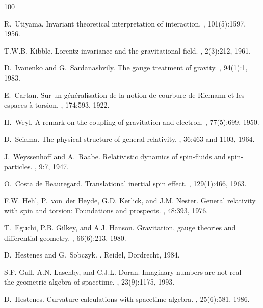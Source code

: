 \documentclass[a4paper]{article}
\numberwithin{equation}{section}
\begin{document}
\begin{thebibliography}{100}

R.~Utiyama.
\newblock Invariant theoretical interpretation of interaction.
, 101(5):1597, 1956.

T.W.B. Kibble.
\newblock Lorentz invariance and the gravitational field.
, 2(3):212, 1961.

D.~Ivanenko and G.~Sardanashvily.
\newblock The gauge treatment of gravity.
, 94(1):1, 1983.

E.~Cartan.
\newblock Sur un g{\'{e}}n{\'{e}}ralisation de la notion de courbure de
  {R}iemann et les espaces {\`{a}} torsion.
, 174:593, 1922.

H.~Weyl.
\newblock A remark on the coupling of gravitation and electron.
, 77(5):699, 1950.

D.~Sciama.
\newblock The physical structure of general relativity.
, 36:463 and 1103, 1964.

J.~Weyssenhoff and A.~Raabe.
\newblock Relativistic dynamics of spin-fluids and spin-particles.
, 9:7, 1947.

O.~{Costa de Beauregard}.
\newblock Translational inertial spin effect.
, 129(1):466, 1963.

F.W. Hehl, P.~von~der Heyde, G.D. Kerlick, and J.M. Nester.
\newblock General relativity with spin and torsion: Foundations and prospects.
, 48:393, 1976.

T.~Eguchi, P.B. Gilkey, and A.J. Hanson.
\newblock Gravitation, gauge theories and differential geometry.
, 66(6):213, 1980.

D.~Hestenes and G.~Sobczyk.
.
\newblock Reidel, Dordrecht, 1984.

S.F. Gull, A.N. Lasenby, and C.J.L. Doran.
\newblock Imaginary numbers are not real --- the geometric algebra of
  spacetime.
, 23(9):1175, 1993.

D.~Hestenes.
\newblock Curvature calculations with spacetime algebra.
, 25(6):581, 1986.


\end{thebibliography}
\end{document}
